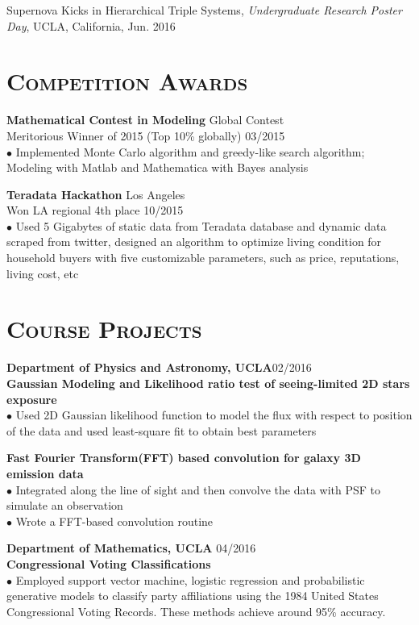 \documentclass[line, margin]{res}
\begin{document}
\begin{resume}
Supernova Kicks in Hierarchical Triple Systems, \textsl{Undergraduate Research Poster Day}, UCLA, California, Jun. 2016

\section{\textsc{Competition Awards}}
\textbf{Mathematical Contest in Modeling} \hfill  Global Contest\\
Meritorious Winner of 2015 (Top 10\% globally) \hfill 03/2015\\
$\bullet$ Implemented Monte Carlo algorithm and greedy-like search algorithm; Modeling with Matlab and Mathematica with Bayes analysis

\textbf{Teradata Hackathon} \hfill  Los Angeles\\
Won LA regional 4th place \hfill 10/2015\\
$\bullet$ Used 5 Gigabytes of static data from Teradata database and dynamic data scraped from twitter, designed an algorithm to optimize living condition for household buyers with five customizable parameters, such as price, reputations, living cost, etc

\section{\textsc{Course Projects}}
\textbf{Department of Physics and Astronomy, UCLA}\hfill 02/2016\\
\textbf{Gaussian Modeling and Likelihood ratio test of seeing-limited  2D stars exposure}\\
$\bullet$ Used 2D Gaussian likelihood function to model the flux with respect to position of the data and used least-square fit to obtain best parameters 

\textbf{Fast Fourier Transform(FFT) based convolution for galaxy 3D emission data}\\
$\bullet$  Integrated along the line of sight and then convolve the data with PSF to simulate an observation\\
$\bullet$ Wrote a FFT-based convolution routine

\textbf{Department of Mathematics, UCLA} \hfill 04/2016\\
\textbf{Congressional Voting Classifications}\\
$\bullet$ Employed support vector machine, logistic regression and probabilistic generative models to classify party affiliations using the 1984 United States Congressional Voting Records. These methods achieve around 95\% accuracy.  


\end{resume}
\end{document}
